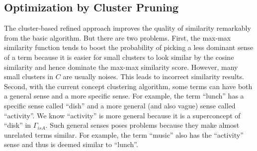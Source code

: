 \subsection{Optimization by Cluster Pruning}
The cluster-based refined approach improves the quality of similarity remarkably from
the basic algorithm. But there are two problems. First, the max-max similarity function tends to boost the probability of picking
a less dominant sense of a term because it is easier for 
small clusters to look similar
by the cosine similarity and hence dominate the max-max similarity score. However, many small clusters in $C$ are usually noises. This leads to incorrect
similarity results.
%
Second, with the current concept clustering algorithm, some terms can have both
a general sense and a more specific sense. For example, the term ``lunch'' has a specific
sense called ``dish'' and a more general (and also vague) sense called ``activity''.
We know ``activity'' is  more general because it is a superconcept of ``disk''
in $\Gamma_{isA}$. Such general senses poses problems because they make almost
unrelated terms similar. For example, the term ``music'' also has the ``activity'' sense
and thus is deemed similar to ``lunch''.
%
%

